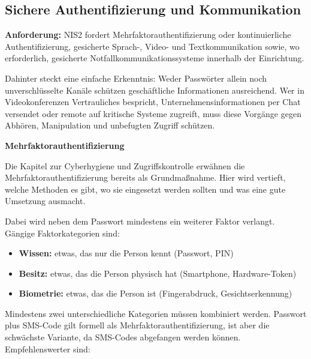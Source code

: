 \newpage
\subsection{Sichere Authentifizierung und Kommunikation}

\textbf{Anforderung:} NIS2 fordert Mehrfaktorauthentifizierung oder kontinuierliche Authentifizierung, gesicherte Sprach-, Video- und Textkommunikation sowie, wo erforderlich, gesicherte Notfallkommunikationssysteme innerhalb der Einrichtung.

Dahinter steckt eine einfache Erkenntnis: Weder Passwörter allein noch unverschlüsselte Kanäle schützen geschäftliche Informationen ausreichend. Wer in Videokonferenzen Vertrauliches bespricht, Unternehmensinformationen per Chat versendet oder remote auf kritische Systeme zugreift, muss diese Vorgänge gegen Abhören, Manipulation und unbefugten Zugriff schützen.

\textbf{Mehrfaktorauthentifizierung}

Die Kapitel zur Cyberhygiene und Zugriffskontrolle erwähnen die Mehrfaktorauthentifizierung bereits als Grundmaßnahme. Hier wird vertieft, welche Methoden es gibt, wo sie eingesetzt werden sollten und was eine gute Umsetzung ausmacht.

Dabei wird neben dem Passwort mindestens ein weiterer Faktor verlangt. Gängige Faktorkategorien sind:

\begin{itemize}
    \item \textbf{Wissen:} etwas, das nur die Person kennt (Passwort, PIN)
    \item \textbf{Besitz:} etwas, das die Person physisch hat (Smartphone, Hardware-Token)
    \item \textbf{Biometrie:} etwas, das die Person ist (Fingerabdruck, Gesichtserkennung)
\end{itemize}

Mindestens zwei unterschiedliche Kategorien müssen kombiniert werden. Passwort plus SMS-Code gilt formell als Mehrfaktorauthentifizierung, ist aber die schwächste Variante, da SMS-Codes abgefangen werden können. Empfehlenswerter sind:

